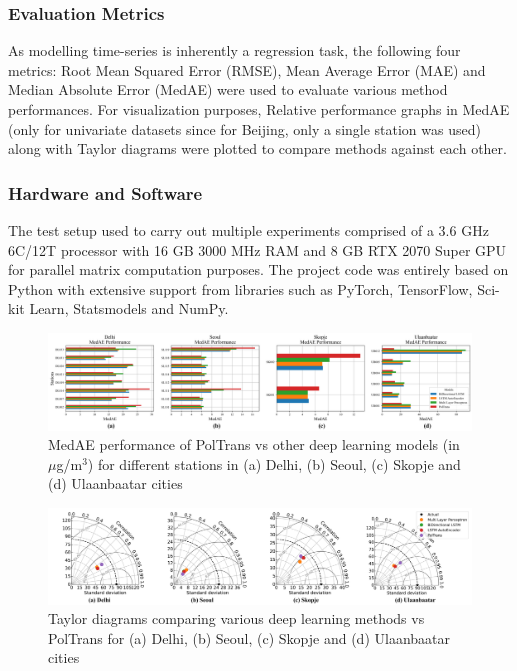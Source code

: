 \documentclass[10pt,journal]{IEEEtran}
\begin{document}
\subsubsection{Evaluation Metrics}
As modelling time-series is inherently a regression task, the following four metrics: Root Mean Squared Error (RMSE), Mean Average Error (MAE) and Median Absolute Error (MedAE) were used to evaluate various method performances. For visualization purposes, Relative performance graphs in MedAE (only for univariate datasets since for Beijing, only a single station was used) along with Taylor diagrams were plotted to compare methods against each other.

\subsubsection{Hardware and Software}
The test setup used to carry out multiple experiments comprised of a 3.6 GHz 6C/12T processor with 16 GB 3000 MHz RAM and 8 GB RTX 2070 Super GPU for parallel matrix computation purposes. The project code was entirely based on Python with extensive support from libraries such as PyTorch, TensorFlow, Sci-kit Learn, Statsmodels and NumPy.

\begin{figure}[h]
\centering
\includegraphics[scale=0.365]{../paper_figures/dl_medae.png}
\caption{MedAE performance of {PolTrans} vs other deep learning models (in $\mu$g/m$^{3}$) for different stations in (a) Delhi, (b) Seoul, (c) Skopje and (d) Ulaanbaatar cities}
\label{fig:dl-medae}
\end{figure}

\begin{figure}[h]
\centering
\includegraphics[width=18cm]{../paper_figures/merged_taylor_dl.png}
\caption{Taylor diagrams comparing various deep learning methods vs {PolTrans} for (a) Delhi, (b) Seoul, (c) Skopje and (d) Ulaanbaatar cities}
\label{fig:dl-taylor}
\end{figure}
\end{document}
